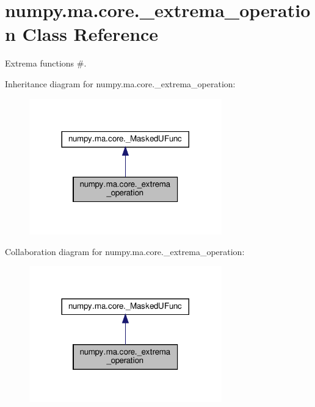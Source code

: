 \hypertarget{classnumpy_1_1ma_1_1core_1_1__extrema__operation}{}\section{numpy.\+ma.\+core.\+\_\+extrema\+\_\+operation Class Reference}
\label{classnumpy_1_1ma_1_1core_1_1__extrema__operation}


Extrema functions \#.  




Inheritance diagram for numpy.\+ma.\+core.\+\_\+extrema\+\_\+operation\+:
\nopagebreak
\begin{figure}[H]
\begin{center}
\leavevmode
\includegraphics[width=236pt]{classnumpy_1_1ma_1_1core_1_1__extrema__operation__inherit__graph}
\end{center}
\end{figure}


Collaboration diagram for numpy.\+ma.\+core.\+\_\+extrema\+\_\+operation\+:
\nopagebreak
\begin{figure}[H]
\begin{center}
\leavevmode
\includegraphics[width=236pt]{classnumpy_1_1ma_1_1core_1_1__extrema__operation__coll__graph}
\end{center}
\end{figure}
